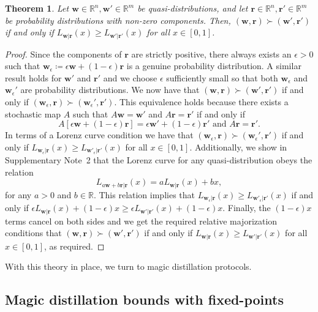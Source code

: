 \documentclass[
onecolumn,
superscriptaddress
]{revtex4-1}
\newtheorem{theorem}{Theorem}
\def\r{\boldsymbol{r}}
\def\w{\boldsymbol{w}}
\begin{document}
\begin{theorem}\label{thm:lcquasi}
	Let $\w \in \mathbb{R}^n,\w'\in \mathbb{R}^m$ be quasi-distributions, and let $\r \in \mathbb{R}^n, \r' \in \mathbb{R}^m$ be probability distributions with non-zero components. Then, $(\w, \r) \succ (\w', \r')$ if and only if $L_{\w|\r}(x) \ge L_{\w' |\r'}(x)$ for all $x \in [0,1]$.
\end{theorem}
\begin{proof}
	Since the components of $\r$ are strictly positive, there always exists an $\epsilon >0$ such that $\w_\epsilon \coloneqq \epsilon \w + (1-\epsilon) \r$ is a genuine probability distribution. A similar result holds for $\w'$ and $\r'$ and we choose $\epsilon$ sufficiently small so that both $\w_\epsilon$ and $\w_\epsilon'$ are probability distributions. We now have that $(\w, \r) \succ (\w', \r')$ if and only if $(\w_\epsilon , \r) \succ (\w_\epsilon', \r')$. This equivalence holds because there exists a stochastic map $A$ such that $A \w = \w'$ and $A \r = \r'$ if and only if 
\begin{equation}
A[\epsilon \w + (1-\epsilon) \r] = \epsilon \w' + (1-\epsilon) \r'\mbox{ and } A\r = \r'.
\end{equation}
In terms of a Lorenz curve condition we have that $(\w_\epsilon , \r) \succ (\w_\epsilon', \r')$ if and only if $L_{\w_\epsilon |\r} (x) \ge L_{\w'_\epsilon |\r'} (x)$ for all $x \in [0,1]$. 
Additionally, we show in Supplementary Note~2 that the Lorenz curve for any quasi-distribution obeys the relation
\begin{equation}
L_{a \w + b \r | \r} (x) = a L_{\w|\r} (x) + bx,
\end{equation}
for any $a >0$ and $b \in \mathbb{R}$. 
This relation implies that $L_{\w_\epsilon |\r} (x) \ge L_{\w'_\epsilon |\r'} (x)$ if and only if $\epsilon L_{\w |\r} (x) + (1-\epsilon) x \ge \epsilon L_{\w' |\r'} (x) + (1-\epsilon) x$. 
Finally, the $(1-\epsilon)x$ terms cancel on both sides and we get the required relative majorization conditions that $(\w, \r) \succ (\w', \r')$ if and only if $L_{\w | \r} (x) \ge L_{\w' | \r'}(x)$ for all $x \in [0,1]$, as required.
\end{proof}

With this theory in place, we turn to magic distillation protocols.

\subsection*{Magic distillation bounds with fixed-points}
\end{document}
